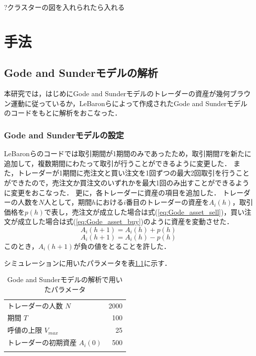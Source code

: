 \documentclass[titlepage]{jsreport}
\begin{document}
?クラスターの図を入れられたら入れる





\chapter{手法} \label{chap:method}
\section{Gode and Sunderモデルの解析}
本研究では，はじめにGode and Sunderモデルのトレーダーの資産が幾何ブラウン運動に従っているか，LeBaronらによって作成されたGode and Sunderモデルのコード\cite{Gode_and_Sunder_code}をもとに解析をおこなった．

\subsection{Gode and Sunderモデルの設定}
LeBaronらのコードでは取引期間が1期間のみであったため，取引期間$T$を新たに追加して，複数期間にわたって取引が行うことができるように変更した．
また，トレーダーが1期間に売注文と買い注文を1回ずつの最大2回取引を行うことができたので，売注文か買注文のいずれかを最大1回のみ出すことができるように変更をおこなった．
更に，各トレーダーに資産の項目を追加した．
トレーダーの人数を$N$人として，期間$h$における$i$番目のトレーダーの資産を$A_i(h)$，取引価格を$p(h)$で表し，売注文が成立した場合は式(\ref{eq:Gode_asset_sell})，買い注文が成立した場合は式(\ref{eq:Gode_asset_buy})のように資産を変動させた．
\begin{equation}
    A_i(h + 1) = A_i(h) + p(h) \label{eq:Gode_asset_sell}
\end{equation}
\begin{equation}
    A_i(h + 1) = A_i(h) - p(h) \label{eq:Gode_asset_buy}
\end{equation}
このとき，$A_i(h + 1)$が負の値をとることを許した．

シミュレーションに用いたパラメータを表\ref{tbl:Gode_param}に示す．

\begin{table}[htbp]
    \begin{center}
        \caption{Gode and Sunderモデルの解析で用いたパラメータ}
        \begin{tabular}{lr}
            \hline\hline
            トレーダーの人数 $N$          & 2000 \\
            期間 $T$                      & 100  \\
            呼値の上限 $V_{max} $         & 25   \\
            トレーダーの初期資産 $A_i(0)$ & 500  \\ \hline
            \label{tbl:Gode_param}
        \end{tabular}
    \end{center}
\end{table}
\end{document}
